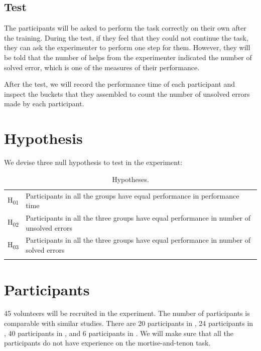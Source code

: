 \subsection{Test}

The participants will be asked to perform the task correctly on their own after the training. During the test, if they feel that they could not continue the task, they can ask the experimenter to perform one step for them. However, they will be told that the number of helps from the experimenter indicated the number of solved error, which is one of the measures of their performance.

After the test, we will record the performance time of each participant and inspect the buckets that they assembled to count the number of unsolved errors made by each participant.

\section{Hypothesis}

We devise three null hypothesis to test in the experiment:

\begin{table}[!htbp]
\caption{Hypotheses.}
\label{tab:hypo}
\small{
\begin{tabular}{ll}
\noalign{\smallskip}\hline\noalign{\smallskip}
H\textsubscript{01} & Participants in all the groups have equal performance in performance time \\
H\textsubscript{02} & Participants in all the three groups have equal performance in number of unsolved errors \\
H\textsubscript{03} & Participants in all the three groups have equal performance in number of solved errors \\
\noalign{\smallskip}\hline
\end{tabular}
}
\end{table}

\section{Participants}

45 volunteers will be recruited in the experiment. The number of participants is comparable with similar studies. There are 20 participants in \cite{webel2013}, 24 participants in \cite{wang2010}, 40 participants in \cite{gavish2015}, and 6 participants in \cite{henderson2009}. We will make sure that all the participants do not have experience on the mortise-and-tenon task.


